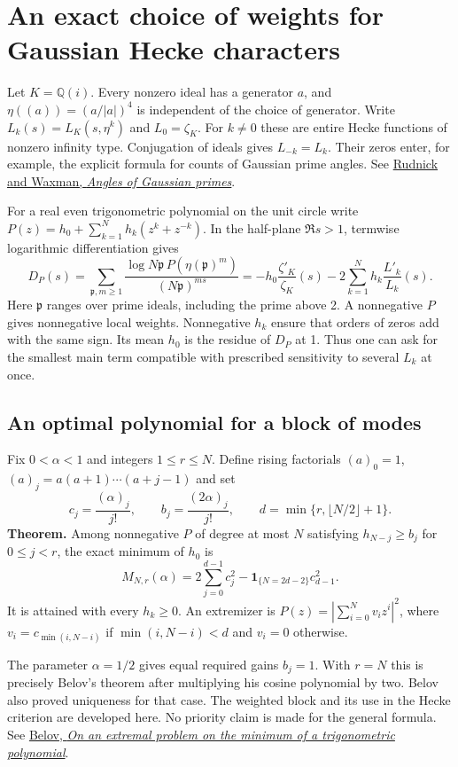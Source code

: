 \section{An exact choice of weights for Gaussian Hecke characters}
Let $K=\mathbb Q(i)$. Every nonzero ideal has a generator $a$, and
$\eta((a))=(a/|a|)^4$ is independent of the choice of generator.
Write $L_k(s)=L_K(s,\eta^k)$ and $L_0=\zeta_K$.
For $k\ne0$ these are entire Hecke functions of nonzero infinity type.
Conjugation of ideals gives $L_{-k}=L_k$.
Their zeros enter, for example, the explicit formula for counts of Gaussian prime angles.
See \href{https://arxiv.org/abs/1705.07498}{Rudnick and Waxman, \emph{Angles of Gaussian primes}}.

For a real even trigonometric polynomial on the unit circle write
$P(z)=h_0+\sum_{k=1}^N h_k(z^k+z^{-k})$.
In the half-plane $\Re s>1$, termwise logarithmic differentiation gives
\[
 D_P(s)=\sum_{\mathfrak p,m\ge1}
 \frac{\log N\mathfrak p\,P(\eta(\mathfrak p)^m)}{(N\mathfrak p)^{ms}}
 =-h_0\frac{\zeta'_K}{\zeta_K}(s)
 -2\sum_{k=1}^N h_k\frac{L'_k}{L_k}(s).
\]
Here $\mathfrak p$ ranges over prime ideals, including the prime above 2. A nonnegative $P$
gives nonnegative local weights. Nonnegative $h_k$ ensure that orders of zeros
add with the same sign. Its mean $h_0$ is the residue of $D_P$ at 1.
Thus one can ask for the smallest main term compatible with prescribed
sensitivity to several $L_k$ at once.

\subsection{An optimal polynomial for a block of modes}
Fix $0<\alpha<1$ and integers $1\le r\le N$. Define rising factorials
$(a)_0=1$, $(a)_j=a(a+1)\cdots(a+j-1)$ and set
\[
 c_j=\frac{(\alpha)_j}{j!},\qquad b_j=\frac{(2\alpha)_j}{j!},\qquad
 d=\min\{r,\lfloor N/2\rfloor+1\}.
\]
\noindent\textbf{Theorem.}
Among nonnegative $P$ of degree at most $N$ satisfying $h_{N-j}\ge b_j$ for
$0\le j<r$, the exact minimum of $h_0$ is
\[
 M_{N,r}(\alpha)=2\sum_{j=0}^{d-1}c_j^2
 -\boldsymbol{1}_{\{N=2d-2\}}c_{d-1}^2.
\]
It is attained with every $h_k\ge0$. An extremizer is
$P(z)=|\sum_{i=0}^N v_i z^i|^2$, where $v_i=c_{\min(i,N-i)}$ if
$\min(i,N-i)<d$ and $v_i=0$ otherwise.

The parameter $\alpha=1/2$ gives equal required gains $b_j=1$. With $r=N$
this is precisely Belov's theorem after multiplying his cosine polynomial by two.
Belov also proved uniqueness for that case. The weighted block and its use in
the Hecke criterion are developed here. No priority claim is made for the general formula.
See \href{https://doi.org/10.1070/IM1994v043n03ABEH001582}
{Belov, \emph{On an extremal problem on the minimum of a trigonometric polynomial}}.

